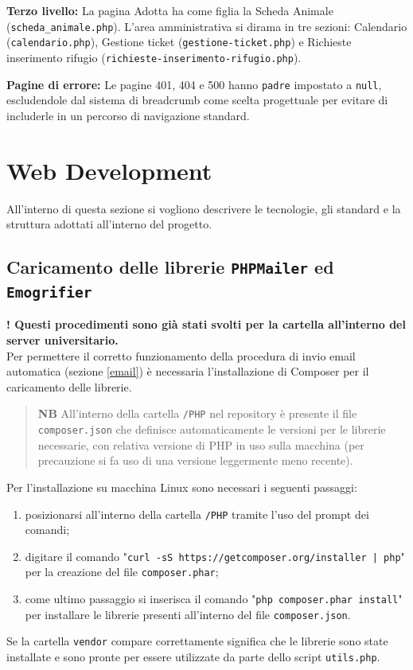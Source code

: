 \documentclass[a4paper,10pt]{article}
\begin{document}
    \textbf{Terzo livello:} La pagina Adotta ha come figlia la Scheda Animale (\texttt{scheda\_animale.php}). L'area amministrativa si dirama in tre sezioni: Calendario (\texttt{calendario.php}), Gestione ticket (\texttt{gestione-ticket.php}) e Richieste inserimento rifugio (\texttt{richieste-inserimento-rifugio.php}).

    \textbf{Pagine di errore:} Le pagine 401, 404 e 500 hanno \texttt{padre} impostato a \texttt{null}, escludendole dal sistema di breadcrumb come scelta progettuale per evitare di includerle in un percorso di navigazione standard.
	\section{Web Development}
	All'interno di questa sezione si vogliono descrivere le tecnologie, gli standard e la struttura adottati all'interno del progetto.
	\subsection{Caricamento delle librerie \texttt{PHPMailer} ed \texttt{Emogrifier}}
	\textbf{! Questi procedimenti sono già stati svolti per la cartella all'interno del server universitario.}\vspace{0.25cm}\\
	Per permettere il corretto funzionamento della procedura di invio email automatica (sezione \ref{email}) è necessaria l'installazione di Composer per il caricamento delle librerie.
	\begin{quote}
		\textbf{NB} All'interno della cartella \texttt{/PHP} nel repository è presente il file \texttt{composer.json} che definisce automaticamente le versioni per le librerie necessarie, con relativa versione di PHP in uso sulla macchina (per precauzione si fa uso di una versione leggermente meno recente). 
	\end{quote}
	Per l'installazione su macchina Linux sono necessari i seguenti passaggi:
	\begin{enumerate}
		\item posizionarsi all'interno della cartella \texttt{/PHP} tramite l'uso del prompt dei comandi;
		\item digitare il comando "\texttt{curl -sS https://getcomposer.org/installer | php}" per la creazione del file \texttt{composer.phar};
		\item come ultimo passaggio si inserisca il comando "\texttt{php composer.phar install}" per installare le librerie presenti all'interno del file \texttt{composer.json}.
	\end{enumerate}
	Se la cartella \texttt{vendor} compare correttamente significa che le librerie sono state installate e sono pronte per essere utilizzate da parte dello script \texttt{utils.php}.
\end{document}

